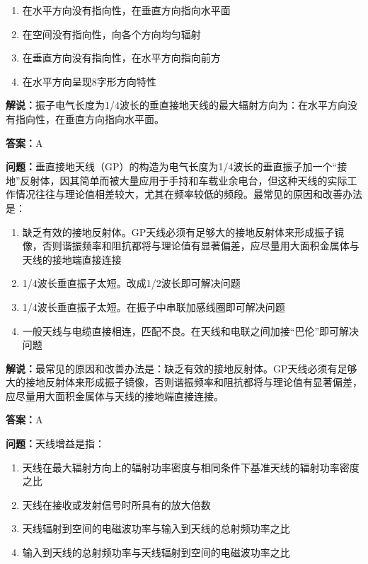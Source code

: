 \begin{enumerate}[label=\Alph*), leftmargin=3em]
	\item 在水平方向没有指向性，在垂直方向指向水平面
	\item 在空间没有指向性，向各个方向均匀辐射
	\item 在垂直方向没有指向性，在水平方向指向前方
	\item 在水平方向呈现8字形方向特性
\end{enumerate}

\textbf{解说：}振子电气长度为1/4波长的垂直接地天线的最大辐射方向为：在水平方向没有指向性，在垂直方向指向水平面。%

\textbf{答案：}A

\textbf{问题：}垂直接地天线（GP）的构造为电气长度为1/4波长的垂直振子加一个“接地”反射体，因其简单而被大量应用于手持和车载业余电台，但这种天线的实际工作情况往往与理论值相差较大，尤其在频率较低的频段。最常见的原因和改善办法是：

\begin{enumerate}[label=\Alph*), leftmargin=3em]
	\item 缺乏有效的接地反射体。GP天线必须有足够大的接地反射体来形成振子镜像，否则谐振频率和阻抗都将与理论值有显著偏差，应尽量用大面积金属体与天线的接地端直接连接
	\item 1/4波长垂直振子太短。改成1/2波长即可解决问题
	\item 1/4波长垂直振子太短。在振子中串联加感线圈即可解决问题
	\item 一般天线与电缆直接相连，匹配不良。在天线和电联之间加接“巴伦”即可解决问题
\end{enumerate}

\textbf{解说：}最常见的原因和改善办法是：缺乏有效的接地反射体。GP天线必须有足够大的接地反射体来形成振子镜像，否则谐振频率和阻抗都将与理论值有显著偏差，应尽量用大面积金属体与天线的接地端直接连接。%

\textbf{答案：}A

\textbf{问题：}天线增益是指：

\begin{enumerate}[label=\Alph*), leftmargin=3em]
	\item 天线在最大辐射方向上的辐射功率密度与相同条件下基准天线的辐射功率密度之比
	\item 天线在接收或发射信号时所具有的放大倍数
	\item 天线辐射到空间的电磁波功率与输入到天线的总射频功率之比
	\item 输入到天线的总射频功率与天线辐射到空间的电磁波功率之比
\end{enumerate}

